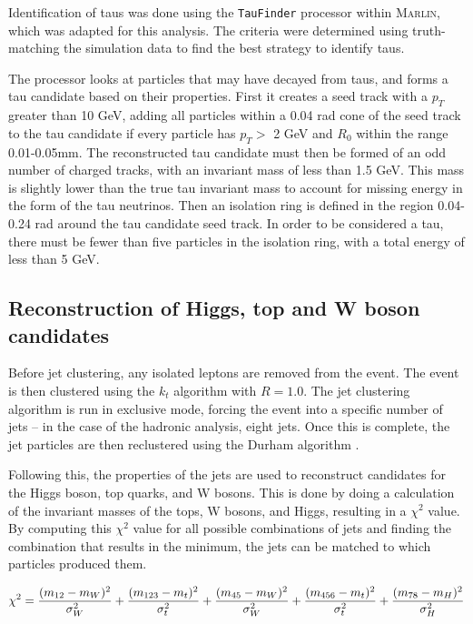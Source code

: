 Identification of taus was done using the \texttt{TauFinder} processor\cite{taufinder} within \textsc{Marlin}, which was adapted for this analysis. The criteria were determined using truth-matching the simulation data to find the best strategy to identify taus.

The processor looks at particles that may have decayed from taus, and forms a tau candidate based on their properties. First it creates a seed track with a $p_T$ greater than 10 GeV, adding all particles within a 0.04 rad cone of the seed track to the tau candidate if every particle has $p_T >$ 2 GeV and $R_0$ within the range 0.01-0.05mm. The reconstructed tau candidate must then be formed of an odd number of charged tracks, with an invariant mass of less than 1.5 GeV. This mass is slightly lower than the true tau invariant mass to account for missing energy in the form of the tau neutrinos. Then an isolation ring is defined in the region 0.04-0.24 rad around the tau candidate seed track. In order to be considered a tau, there must be fewer than five particles in the isolation ring, with a total energy of less than 5 GeV.

\subsection{Reconstruction of Higgs, top and W boson candidates}
Before jet clustering, any isolated leptons are removed from the event. The event is then clustered using the $k_t$ algorithm with $R = 1.0$. The jet clustering algorithm is run in exclusive mode, forcing the event into a specific number of jets -- in  the case of the hadronic analysis, eight jets. Once this is complete, the jet particles are then reclustered using the Durham algorithm .

Following this, the properties of the jets are used to reconstruct candidates for the Higgs boson, top quarks, and W bosons. This is done by doing a calculation of the invariant masses of the tops, W bosons, and Higgs, resulting in a $\chi^2$ value. By computing this $\chi^2$ value for all possible combinations of jets and finding the combination that results in the minimum, the jets can be matched to which particles produced them. 

\begin{equation}
  \centering
	\chi^2 = \frac{(m_{12} - m_W)^2}{\sigma^2_W} + \frac{(m_{123} - m_t)^2}{\sigma^2_{t}} + \frac{(m_{45} - m_W)^2}{\sigma^2_W} + \frac{(m_{456} - m_t)^2}{\sigma^2_{t}} + \frac{(m_{78} - m_H)^2}{\sigma^2_H}
\label{eq:chi-square}
\end{equation}


